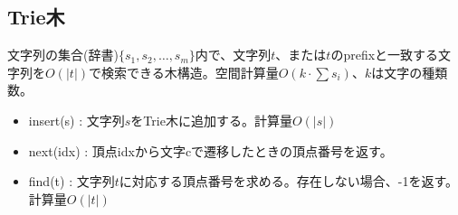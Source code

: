 \subsection{Trie木}

文字列の集合(辞書)$\{s_1, s_2, \ldots, s_m \}$内で、文字列$t$、または$t$のprefixと一致する文字列を$O(|t|)$で検索できる木構造。空間計算量$O(k \cdot \sum{s_i})$、$k$は文字の種類数。

\begin{itemize}
    \item insert(s) : 文字列$s$をTrie木に追加する。計算量$O(|s|)$
    \item next(idx) : 頂点idxから文字cで遷移したときの頂点番号を返す。
    \item find(t) : 文字列$t$に対応する頂点番号を求める。存在しない場合、-1を返す。計算量$O(|t|)$
\end{itemize}

